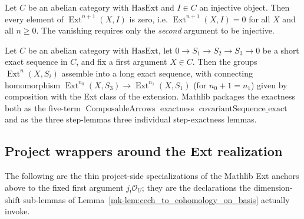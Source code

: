 \begin{lemma}
  \label{mk-lem:ext_eq_zero_of_injective_mathlib}
  \mathlibok

  Let \(C\) be an abelian category with \(\mathrm{HasExt}\) and \(I \in C\) an injective
  object. Then every element of \(\operatorname{Ext}^{n+1}(X, I)\) is zero, i.e.
  \(\operatorname{Ext}^{n+1}(X, I) = 0\) for all \(X\) and all \(n \geq 0\). The
  vanishing requires only the \emph{second} argument to be injective.
\end{lemma}

\begin{lemma}
  \label{mk-lem:ext_covariant_les_mathlib}
  \mathlibok

  Let \(C\) be an abelian category with \(\mathrm{HasExt}\), let \(0 \to S_1 \to S_2 \to
  S_3 \to 0\) be a short exact sequence in \(C\), and fix a first argument \(X \in C\).
  Then the groups \(\operatorname{Ext}^n(X, S_i)\) assemble into a long exact sequence,
  with connecting homomorphism \(\operatorname{Ext}^{n_0}(X, S_3) \to
  \operatorname{Ext}^{n_1}(X, S_1)\) (for \(n_0 + 1 = n_1\)) given by composition with
  the Ext class of the extension. Mathlib packages the exactness both as the
  five-term \(\operatorname{ComposableArrows}\) exactness
  \(\operatorname{covariantSequence\_exact}\) and as the three step-lemmas
  three individual step-exactness lemmas.
\end{lemma}

\subsection{Project wrappers around the Ext realization}

The following are the thin project-side specializations of the Mathlib Ext anchors above to the
fixed first argument \(j_!\mathcal{O}_U\); they are the declarations the dimension-shift sub-lemmas
of Lemma~\ref{mk-lem:cech_to_cohomology_on_basis} actually invoke.

